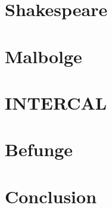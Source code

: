\documentclass{sig-alternate}
\begin{document}


\newpage
\section{Shakespeare}



\newpage
\section{Malbolge}



\newpage
\section{INTERCAL}



\newpage
\section{Befunge}



\newpage

\section{Conclusion}

\blindtext[2]

\printbibliography
\end{document}
